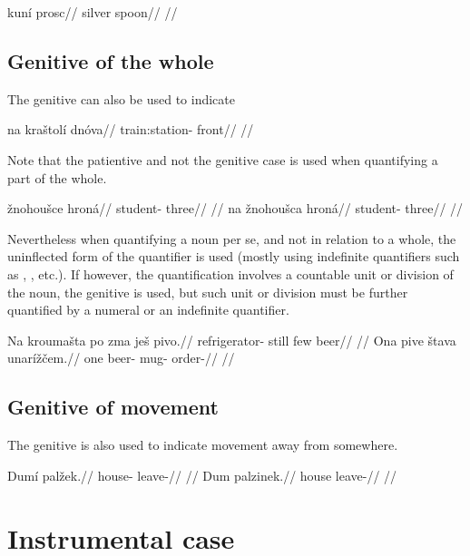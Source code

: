 \pex
\begingl
\gla kun\'i prosc//
\glb silver spoon//
\glft {}//
\endgl
\xe

\subsection{Genitive of the whole}
The genitive can also be used to indicate

\pex
\begingl
\gla na kra\v{s}tol\'i dn\'ova//
\glb {} train:station- front//
\glft {}//
\endgl
\xe

Note that the patientive and not the genitive case is used when quantifying a part of the whole.

\pex
\a
\begingl
\gla *\v{z}nohou\v{s}ce hron\'a//
\glb student- three//
\glft {}//
\endgl
\a
\begingl
\gla na \v{z}nohou\v{s}ca hron\'a//
\glb {} student- three//
\glft {}//
\endgl
\xe

Nevertheless when quantifying a noun per se, and not in relation to a whole, the uninflected form of the quantifier is used (mostly using indefinite quantifiers such as , , etc.). If however, the quantification involves a countable unit or division of the noun, the genitive is used, but such unit or division must be further quantified by a numeral or an indefinite quantifier.

\pex
\a
\begingl
\gla Na krouma\v{s}ta po zma je\v{s} pivo.//
\glb {} refrigerator- still few  beer//
\glft {}//
\endgl
\a
\begingl
\gla Ona pive \v{s}tava unar\'i\v{z}\v{c}em.//
\glb one beer- mug- order-//
\glft {}//
\endgl
\xe

\subsection{Genitive of movement}

The genitive is also used to indicate movement away from somewhere.

\pex
\a
\begingl
\gla Dum\'i pal\v{z}ek.//
\glb house- leave-//
\glft {}//
\endgl
\a
\begingl
\gla Dum palzinek.//
\glb house leave-//
\glft {}//
\endgl
\xe

\section{Instrumental case}


